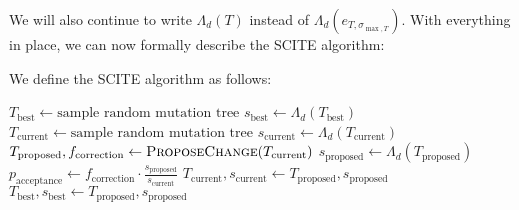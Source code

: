 We will also continue to write $\Lambda_d(T)$ instead of $\Lambda_d(e_{T, \sigma_{\max, T}})$. With everything in place, we can now formally describe the \ac{SCITE} algorithm:

\begin{definition} We define the \ac{SCITE} algorithm as follows:
    \begin{algorithmic}
            \State $T_\mathrm{best} \leftarrow \text{sample random mutation tree}$
            \State $s_\mathrm{best} \leftarrow \Lambda_d(T_\mathrm{best})$
                \State $T_\mathrm{current} \leftarrow \text{sample random mutation tree}$
                \State $s_\mathrm{current} \leftarrow \Lambda_d(T_\mathrm{current})$
                    \State $T_\mathrm{proposed}, f_\mathrm{correction} \leftarrow \textsc{ProposeChange}(T_\mathrm{current})$
                    \State $s_\mathrm{proposed} \leftarrow \Lambda_d(T_\mathrm{proposed})$
                    \State $p_\mathrm{acceptance} \leftarrow f_\mathrm{correction} \cdot \frac{s_\mathrm{proposed}}{s_\mathrm{current}}$
                        \State $T_\mathrm{current}, s_\mathrm{current} \leftarrow T_\mathrm{proposed}, s_\mathrm{proposed}$
                    \EndIf
                        \State $T_\mathrm{best}, s_\mathrm{best} \leftarrow T_\mathrm{proposed}, s_\mathrm{proposed}$
                    \EndIf
                \EndFor
            \EndFor
        \EndFunction
    \end{algorithmic}
\end{definition}